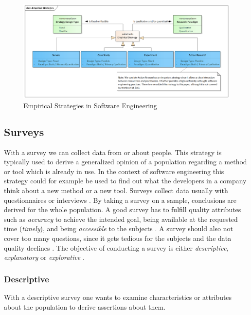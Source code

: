\documentclass[runningheads]{llncs}
\begin{document}
\begin{figure}[H]
	\centering
	\includegraphics[width=1.0\textwidth]{Empirical_Strategies}
	\caption{Empirical Strategies in Software Engineering \cite{Runeson2008,Wohlin:2012:ESE:2349018}}
	\label{fig:empirical-strategies}
\end{figure} 


\subsection{Surveys}
With a survey we can collect data from or about people. This strategy is typically used to derive a generalized opinion of a population regarding a method or tool which is already in use. In the context of software engineering this strategy could for example be used to find out what the developers in a company think about a new method or a new tool. Surveys collect data usually with questionnaires or interviews \cite{fink2003survey}. By taking a survey on a sample, conclusions are derived for the whole population. A good survey has to fulfill quality attributes such as \textit{accuracy} to achieve the intended goal, being available at the requested time (\textit{timely}), and being \textit{accessible} to the subjects \cite{biemer2003introduction}. A survey should also not cover too many questions, since it gets tedious for the subjects and the data quality declines \cite{Wohlin:2012:ESE:2349018}. The objective of conducting a survey is either \textit{descriptive}, \textit{explanatory} or \textit{explorative} \cite{fink2003survey}.

\subsubsection{Descriptive} 
With a descriptive survey one wants to examine characteristics or attributes about the population to derive assertions \cite{Wohlin:2012:ESE:2349018} about them.
\end{document}
